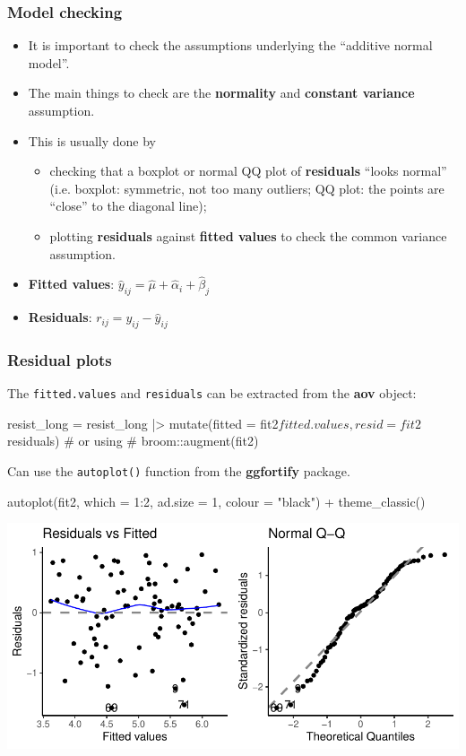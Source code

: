 \documentclass[a4paper]{article}
\begin{document}
\subsubsection{Model checking}
\begin{itemize}
	\item It is important to check the assumptions underlying the ``additive normal model''.
	\item The main things to check are the \textbf{normality} and \textbf{constant variance} assumption.
	\item This is usually done by
	\begin{itemize}
		\item checking that a boxplot or normal QQ plot of \textbf{residuals} ``looks normal'' (i.e. boxplot: symmetric, not too many outliers; QQ plot: the points are ``close'' to the diagonal line);
		\item plotting \textbf{residuals} against \textbf{fitted values} to check the common variance assumption.
	\end{itemize}
	\item \textbf{Fitted values}: \( \hat{y}_{ij} = \hat{\mu} + \hat{\alpha}_i + \hat{\beta}_j \)
	\item \textbf{Residuals}: \( r_{ij} = y_{ij} - \hat{y}_{ij} \) 
\end{itemize}
\subsubsection{Residual plots}

The \lstinline|fitted.values| and \lstinline|residuals| can be extracted from the \textbf{aov} object:
\begin{Schunk}
\begin{Sinput}
resist_long = resist_long |> 
  mutate(fitted = fit2$fitted.values,
         resid = fit2$residuals)
# or using 
# broom::augment(fit2)
\end{Sinput}
\end{Schunk}
Can use the \lstinline|autoplot()| function from the \textbf{ggfortify} package.
\begin{Schunk}
\begin{Sinput}
autoplot(fit2, which = 1:2, ad.size = 1, colour = "black") +
theme_classic()
\end{Sinput}


{\centering \includegraphics[width=\maxwidth]{figure/listings-unnamed-chunk-298-1} 

}

\end{Schunk}
\end{document}
